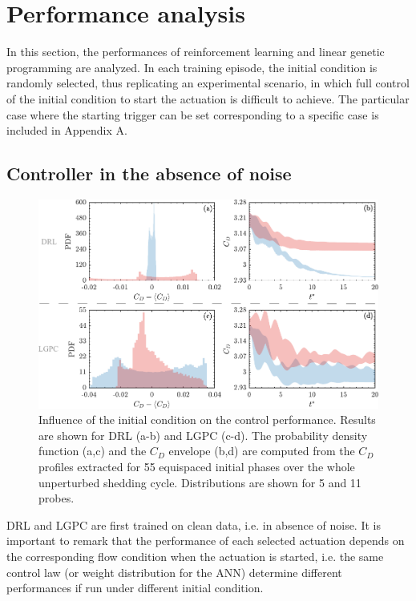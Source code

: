 \section{Performance analysis}\label{s:result}

In this section, the performances of reinforcement learning and linear genetic programming are analyzed. In each training episode, the initial condition is randomly selected, thus replicating an experimental scenario, in which full control of the initial condition to start the actuation is difficult to achieve. The particular case where the starting trigger can be set corresponding to a specific case is included in Appendix A.

\subsection{Controller in the absence of noise}%
\label{ss:variableIC}

\begin{figure}[t]
    \centering
    \includegraphics[width=0.99\linewidth]{Figures/4.pdf}
    \caption{Influence of the initial condition on the control performance. Results are shown for DRL (a-b) and LGPC (c-d). The probability density function (a,c) and the $C_D$ envelope (b,d) are computed from the $C_D$ profiles extracted for 55 equispaced initial phases over the whole unperturbed shedding cycle. Distributions are shown for 5  and 11  probes.}
    \label{fig:Clean_rIC}
\end{figure}

DRL and LGPC are first trained on clean data, i.e. in absence of noise. It is important to remark that the performance of each selected actuation depends on the corresponding flow condition when the actuation is started, i.e. the same control law (or weight distribution for the ANN) determine different performances if run under different initial condition.

